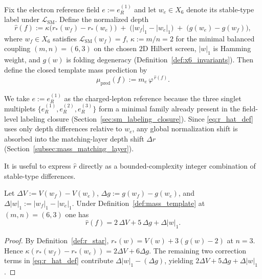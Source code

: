 \begin{definition}\label{def:mass_template}
Fix the electron reference field $e:=e_R^{(1)}$ and let $w_e\in X_6$ denote its stable-type label under $\mathcal{L}_{\mathrm{SM}}$.
Define the normalized depth
\begin{equation}\label{eq:r_hat_def}
\widehat r(f):=\kappa\bigl(r_\ast(w_f)-r_\ast(w_e)\bigr)
\;+\;\bigl(|w_f|_1-|w_e|_1\bigr)
\;+\;\bigl(g(w_e)-g(w_f)\bigr),
\end{equation}
where $w_f\in X_6$ satisfies $\mathcal{L}_{\mathrm{SM}}(w_f)=f$, $\kappa:=m/n=2$ for the minimal balanced coupling $(m,n)=(6,3)$ on the chosen $2$D Hilbert screen, $|w|_1$ is Hamming weight, and $g(w)$ is folding degeneracy (Definition~\ref{def:x6_invariants}).
Then define the closed template mass prediction by
\begin{equation}\label{eq:mass_template}
\mu_{\mathrm{pred}}(f):=m_e\,\varphi^{\,\widehat r(f)}.
\end{equation}
\end{definition}

\begin{remark}\label{rem:electron_reference_choice}
We take $e:=e_R^{(1)}$ as the charged-lepton reference because the three singlet multiplets $\{e_R^{(1)},e_R^{(2)},e_R^{(3)}\}$ form a minimal family already present in the field-level labeling closure (Section~\ref{sec:sm_labeling_closure}).
Since \eqref{eq:r_hat_def} uses only depth differences relative to $w_e$, any global normalization shift is absorbed into the matching-layer depth shift $\Delta r$ (Section~\ref{subsec:mass_matching_layer}).
\end{remark}

It is useful to express $\widehat r$ directly as a bounded-complexity integer combination of stable-type differences.
\begin{proposition}\label{prop:rhat_simplified}
Let $\Delta V:=V(w_f)-V(w_e)$, $\Delta g:=g(w_f)-g(w_e)$, and $\Delta|w|_1:=|w_f|_1-|w_e|_1$.
Under Definition~\ref{def:mass_template} at $(m,n)=(6,3)$ one has
\begin{equation}\label{eq:rhat_251}
\widehat r(f)=2\,\Delta V+5\,\Delta g+\Delta|w|_1.
\end{equation}
\end{proposition}
\begin{proof}
By Definition~\ref{def:r_star}, $r_\ast(w)=V(w)+3(g(w)-2)$ at $n=3$.
Hence $\kappa(r_\ast(w_f)-r_\ast(w_e))=2\Delta V+6\Delta g$.
The remaining two correction terms in \eqref{eq:r_hat_def} contribute $\Delta|w|_1-(\Delta g)$, yielding $2\Delta V+5\Delta g+\Delta|w|_1$.
\end{proof}

